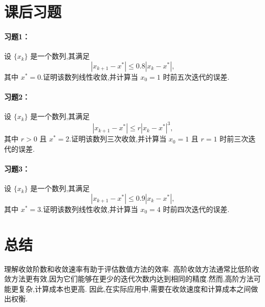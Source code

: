 \section*{课后习题}

\paragraph{习题1：}
设 $\{x_k\}$ 是一个数列,其满足
\[
|x_{k+1} - x^*| \leq 0.8 |x_k - x^*|,
\]
其中 $x^* = 0$.证明该数列线性收敛,并计算当 $x_0 = 1$ 时前五次迭代的误差.

\paragraph{习题2：}
设 $\{x_k\}$ 是一个数列,其满足
\[
|x_{k+1} - x^*| \leq r |x_k - x^*|^3,
\]
其中 $r > 0$ 且 $x^* = 2$.证明该数列三次收敛,并计算当 $x_0 = 1$ 且 $r = 1$ 时前三次迭代的误差.

\paragraph{习题3：}
设 $\{x_k\}$ 是一个数列,其满足
\[
|x_{k+1} - x^*| \leq 0.9 |x_k - x^*|,
\]
其中 $x^* = 3$.证明该数列线性收敛,并计算当 $x_0 = 4$ 时前四次迭代的误差.

\section*{总结}

理解收敛阶数和收敛速率有助于评估数值方法的效率.
高阶收敛方法通常比低阶收敛方法更有效,因为它们能够在更少的迭代次数内达到相同的精度.然而,高阶方法可能更复杂,计算成本也更高.
因此,在实际应用中,需要在收敛速度和计算成本之间做出权衡.





